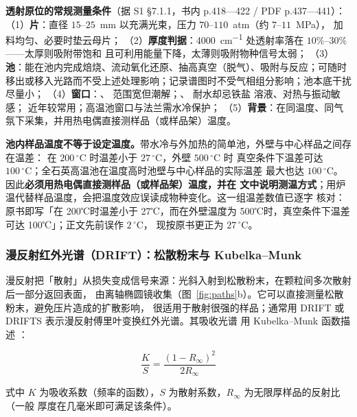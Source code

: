 \begin{measure}
\textbf{透射原位的常规测量条件}（据 S1 §7.1.1，书内 p.418—422 / PDF p.437—441）：
（1）\textbf{片}：直径 $15$--$25$~mm 以充满光束，压力 $70$--$110$~atm（约 $7$--$11$~MPa），
加料均匀、必要时垫云母片；
（2）\textbf{厚度判据}：\qty{4000}{cm^{-1}} 处透射率落在 $10\%$--$30\%$——太厚则吸附带饱和
且可利用能量下降，太薄则吸附物种信号太弱；
（3）\textbf{池}：能在池内完成焙烧、流动氧化还原、抽高真空（脱气）、吸附与反应；可随时
移出或移入光路而不受上述处理影响；记录谱图时不受气相组分影响；池本底干扰尽量小；
（4）\textbf{窗口}：、 范围宽但潮解；、 耐水却忌铁盐
溶液、对热与振动敏感； 近年较常用；高温池窗口与法兰需水冷保护；
（5）\textbf{背景}：在同温度、同气氛下采集，并用热电偶直接测样品（或样品架）温度。
\end{measure}

\begin{pitfall}
\textbf{池内样品温度不等于设定温度。}带水冷与外加热的简单池，外壁与中心样品之间存在温差：
在 $200\,^{\circ}\mathrm{C}$ 时温差小于 $27\,^{\circ}\mathrm{C}$，外壁 $500\,^{\circ}\mathrm{C}$ 时
真空条件下温差可达 $100\,^{\circ}\mathrm{C}$；全石英高温池在温度高时池壁与中心样品的实际温差
最大也达 $100\,^{\circ}\mathrm{C}$。因此\textbf{必须用热电偶直接测样品（或样品架）温度，并在
文中说明测温方式}；用炉温代替样品温度，会把温度效应误读成物种变化。这一组温差数值已逐字
核对：原书即写「在 200℃时温差小于 27℃，而在外壁温度为 500℃时，真空条件下温差可达
100℃」；正文先前误作 $2\,^{\circ}\mathrm{C}$，
现按原书更正为 $27\,^{\circ}\mathrm{C}$。
\end{pitfall}

\subsubsection{漫反射红外光谱（DRIFT）：松散粉末与 Kubelka--Munk}

漫反射把「散射」从损失变成信号来源：光斜入射到松散粉末，在颗粒间多次散射后一部分返回表面，
由离轴椭圆镜收集（图~\ref{fig:paths}b）。它可以直接测量松散粉末，避免压片造成的扩散影响，
很适用于散射很强的样品；通常用 DRIFT 或 DRIFTS 表示漫反射傅里叶变换红外光谱。其吸收光谱
用 Kubelka--Munk 函数描述 ：

\begin{equation}\label{eq:km}
\frac{K}{S}=\frac{\left(1-R_{\infty}\right)^{2}}{2R_{\infty}}
\end{equation}

式中 $K$ 为吸收系数（频率的函数），$S$ 为散射系数，$R_{\infty}$ 为无限厚样品的反射比（一般
厚度在几毫米即可满足该条件）。

